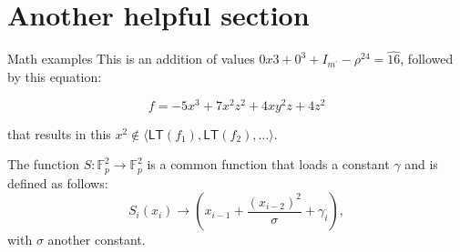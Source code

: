 \documentclass[banner={uniud},handout]{presenta}
\begin{document}
\section{Another helpful section}

\begin{frame}{Math examples}
  This is an addition of values $0x3 + 0^3 + I_{m^\prime} - \rho^{24} = \widehat{16}$, followed by this equation:

  \begin{equation*}
    f = - 5x^3 + 7x^2z^2 + 4xy^2z + 4z^2  
  \end{equation*}

  that results in this $x^2 \notin \langle \mathsf{LT}(f_1), \mathsf{LT}(f_2), \ldots \rangle$.

  \begin{definition*}
    The function $S: \mathbb{F}^2_p \rightarrow \mathbb{F}^2_p$ is a common function that loads a constant $\gamma$ and is defined as follows:
    \begin{equation*}
      S_i(x_i) \rightarrow \left( x_{i-1} + \frac{(x_{i-2})^2}{\sigma} + \gamma_i \right),
    \end{equation*}
    with $\sigma$ another constant.
  \end{definition*}
\end{frame}


\end{document}
